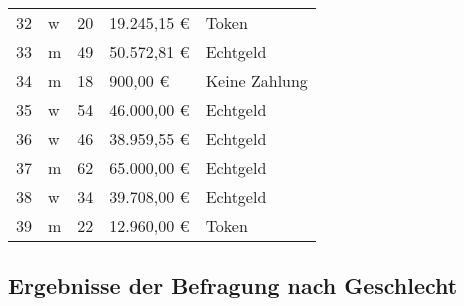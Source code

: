 \begin{table}[H]
\begin{tabular}{lllll}
32                                 & w                                        & 20                                  & 19.245,15 €                             & Token                                 \\
33                                 & m                                        & 49                                  & 50.572,81 €                             & Echtgeld                              \\
34                                 & m                                        & 18                                  & 900,00 €                                & Keine Zahlung                         \\
35                                 & w                                        & 54                                  & 46.000,00 €                             & Echtgeld                              \\
36                                 & w                                        & 46                                  & 38.959,55 €                             & Echtgeld                              \\
37                                 & m                                        & 62                                  & 65.000,00 €                             & Echtgeld                              \\
38                                 & w                                        & 34                                  & 39.708,00 €                             & Echtgeld                              \\
39                                 & m                                        & 22                                  & 12.960,00 €                             & Token                                
\end{tabular}
\label{tab:rohdaten}
\end{table}

\subsection{Ergebnisse der Befragung nach Geschlecht}


